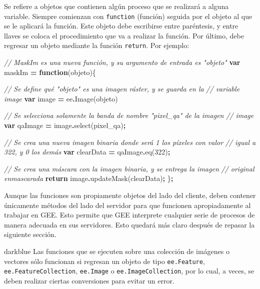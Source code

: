 \documentclass[
  12pt,
  letterpaper,
  twoside]{book}
\newenvironment{Shaded}{\begin{snugshade}}{\end{snugshade}}
\newcommand{\CommentTok}[1]{\textcolor[rgb]{0.56,0.35,0.01}{\textit{#1}}}
\newcommand{\ControlFlowTok}[1]{\textcolor[rgb]{0.13,0.29,0.53}{\textbf{#1}}}
\newcommand{\DecValTok}[1]{\textcolor[rgb]{0.00,0.00,0.81}{#1}}
\newcommand{\FunctionTok}[1]{\textcolor[rgb]{0.00,0.00,0.00}{#1}}
\newcommand{\KeywordTok}[1]{\textcolor[rgb]{0.13,0.29,0.53}{\textbf{#1}}}
\newcommand{\NormalTok}[1]{#1}
\newcommand{\OperatorTok}[1]{\textcolor[rgb]{0.81,0.36,0.00}{\textbf{#1}}}
\newcommand{\StringTok}[1]{\textcolor[rgb]{0.31,0.60,0.02}{#1}}
\begin{document}
Se refiere a objetos que contienen algún proceso que se realizará a alguna variable. Siempre comienzan con \texttt{function} (función) seguida por el objeto al que se le aplicará la función. Este objeto debe escribirse entre paréntesis, y entre llaves se coloca el procedimiento que va a realizar la función. Por último, debe regresar un objeto mediante la función \texttt{return}. Por ejemplo:

\begin{Shaded}
\begin{Highlighting}[]
\CommentTok{// MaskIm es una nueva función, y su argumento de entrada es "objeto"}
\KeywordTok{var}\NormalTok{ maskIm }\OperatorTok{=} \KeywordTok{function}\NormalTok{(objeto)\{ }

\CommentTok{// Se define qué "objeto" es una imagen ráster, y se guarda en la }
\CommentTok{// variable image}
\KeywordTok{var}\NormalTok{ image }\OperatorTok{=}\NormalTok{ ee}\OperatorTok{.}\FunctionTok{Image}\NormalTok{(objeto)     }
 
\CommentTok{// Se selecciona solamente la banda de nombre "pixel\_qa" de la imagen}
\CommentTok{// image}
\KeywordTok{var}\NormalTok{ qaImage }\OperatorTok{=}\NormalTok{ image}\OperatorTok{.}\FunctionTok{select}\NormalTok{(}\StringTok{\textquotesingle{}pixel\_qa\textquotesingle{}}\NormalTok{)}\OperatorTok{;}
     
\CommentTok{// Se crea una nueva imagen binaria donde será 1 los píxeles con valor }
\CommentTok{// igual a 322, y 0 los demás}
\KeywordTok{var}\NormalTok{ clearData }\OperatorTok{=}\NormalTok{ qaImage}\OperatorTok{.}\FunctionTok{eq}\NormalTok{(}\DecValTok{322}\NormalTok{)}\OperatorTok{;}      
    
\CommentTok{// Se crea una máscara con la imagen binaria, y se entrega la imagen }
\CommentTok{// original enmascarada}
\ControlFlowTok{return}\NormalTok{ image}\OperatorTok{.}\FunctionTok{updateMask}\NormalTok{(clearData)}\OperatorTok{;}      
\NormalTok{ \}}\OperatorTok{;}
\end{Highlighting}
\end{Shaded}

Aunque las funciones son propiamente objetos del lado del cliente, deben contener únicamente métodos del lado del servidor para que funcionen apropiadamente al trabajar en GEE. Esto permite que GEE interprete cualquier serie de procesos de manera adecuada en sus servidores. Esto quedará más claro después de repasar la siguiente sección.

\begin{bluebox2}

\begin{awesomeblock}{5pt}{\faLightbulb}{darkblue}
Las funciones que se ejecuten sobre una colección de imágenes o vectores sólo funcionan si regresan un objeto de tipo \texttt{ee.Feature}, \texttt{ee.FeatureCollection}, \texttt{ee.Image} o \texttt{ee.ImageCollection}, por lo cual, a veces, se deben realizar ciertas conversiones para evitar un error.

\end{awesomeblock}

\end{bluebox2}
\end{document}
